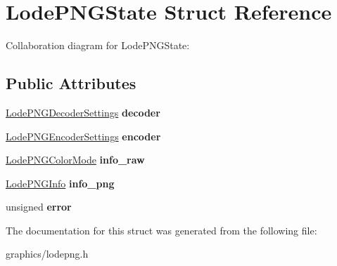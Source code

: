 \hypertarget{struct_lode_p_n_g_state}{\section{Lode\+P\+N\+G\+State Struct Reference}
\label{struct_lode_p_n_g_state}
}


Collaboration diagram for Lode\+P\+N\+G\+State\+:
\subsection*{Public Attributes}
\begin{DoxyCompactItemize}
\item 
\hypertarget{struct_lode_p_n_g_state_abd2c38ffc68f04b0e4159e1f97ba1f76}{\hyperlink{struct_lode_p_n_g_decoder_settings}{Lode\+P\+N\+G\+Decoder\+Settings} {\bfseries decoder}}\label{struct_lode_p_n_g_state_abd2c38ffc68f04b0e4159e1f97ba1f76}

\item 
\hypertarget{struct_lode_p_n_g_state_ac63d91db835129d02eb83bbe81de347e}{\hyperlink{struct_lode_p_n_g_encoder_settings}{Lode\+P\+N\+G\+Encoder\+Settings} {\bfseries encoder}}\label{struct_lode_p_n_g_state_ac63d91db835129d02eb83bbe81de347e}

\item 
\hypertarget{struct_lode_p_n_g_state_a597bc08de787147474d43adf8b6ceacf}{\hyperlink{struct_lode_p_n_g_color_mode}{Lode\+P\+N\+G\+Color\+Mode} {\bfseries info\+\_\+raw}}\label{struct_lode_p_n_g_state_a597bc08de787147474d43adf8b6ceacf}

\item 
\hypertarget{struct_lode_p_n_g_state_a08d9ac43c995fcf34d72b1d37047b6fa}{\hyperlink{struct_lode_p_n_g_info}{Lode\+P\+N\+G\+Info} {\bfseries info\+\_\+png}}\label{struct_lode_p_n_g_state_a08d9ac43c995fcf34d72b1d37047b6fa}

\item 
\hypertarget{struct_lode_p_n_g_state_a1a00a050da588cf3c2b7a6252bebb0cd}{unsigned {\bfseries error}}\label{struct_lode_p_n_g_state_a1a00a050da588cf3c2b7a6252bebb0cd}

\end{DoxyCompactItemize}


The documentation for this struct was generated from the following file\+:\begin{DoxyCompactItemize}
\item 
graphics/lodepng.\+h\end{DoxyCompactItemize}
